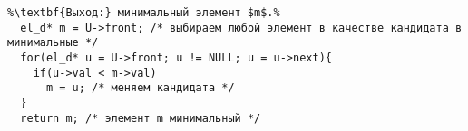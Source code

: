 \begin{lstlisting}[escapechar=\%]
%\noindent\textbf{Вход:} конечное частично упорядоченное множество $U$.\\%
%\textbf{Выход:} минимальный элемент $m$.%
  el_d* m = U->front; /* выбираем любой элемент в качестве кандидата в минимальные */
  for(el_d* u = U->front; u != NULL; u = u->next){
    if(u->val < m->val)
      m = u; /* меняем кандидата */
  }
  return m; /* элемент m минимальный */
\end{lstlisting}
